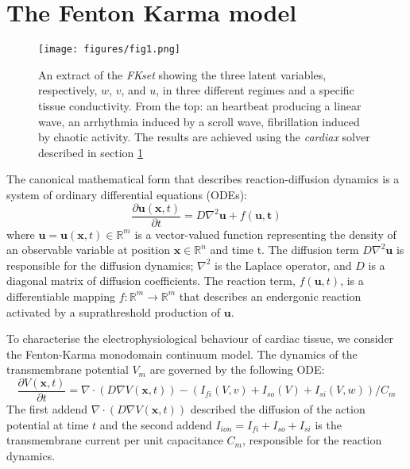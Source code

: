 \documentclass{article}
\begin{document}
    \section{The Fenton Karma model}
    \begin{figure}
        \centering
        \texttt{[image: figures/fig1.png]}
        \caption{An extract of the \textit{FKset} showing the three latent variables, respectively, $w$, $v$, and $u$, in three different regimes and a specific tissue conductivity. From the top: an heartbeat producing a linear wave, an arrhythmia induced by a scroll wave, fibrillation induced by chaotic activity. The results are achieved using the \textit{cardiax} solver described in section \ref{}}
        \label{fig:Figure 1.}
    \end{figure}
        The canonical mathematical form that describes reaction-diffusion dynamics is a system of ordinary differential equations (ODEs):
        \begin{equation}
            \frac{\partial \mathbf{u}(\mathbf{x}, t)}{\partial t} = D\nabla^2 \mathbf{u} + f(\mathbf{u, t})
        \end{equation}
        where $\mathbf{u} = \mathbf{u}(\mathbf{x}, t) \in \mathbb{R}^m$ is a vector-valued function representing the density of an observable variable at position $\mathbf{x} \in \mathbb{R}^n$ and time t.
        The diffusion term $D\nabla^2\mathbf{u}$ is responsible for the diffusion dynamics; $\nabla^2$ is the Laplace operator, and $D$ is a diagonal matrix of diffusion coefficients.
        The reaction term, $f(\mathbf{u}, t)$, is a differentiable mapping $f: \mathbb{R}^m \rightarrow \mathbb{R}^m$ that describes an endergonic reaction activated by a suprathreshold production of $\mathbf{u}$.
        
        To characterise the electrophysiological behaviour of cardiac tissue, we consider the Fenton-Karma\cite{fenton1998vortex} monodomain continuum model. The dynamics of the transmembrane potential $V_m$ are governed by the following ODE:
        \begin{equation}
            \frac{\partial V(\mathbf{x}, t)}{\partial t} = \nabla \cdot (D \nabla V(\mathbf{x},  t)) - {(I_{fi}(V, v) + I_{so}(V) + I_{si}(V, w))} / {C_m}
        \end{equation}
        The first addend $\nabla \cdot (D \nabla V(\mathbf{x},  t))$ described the diffusion of the action potential at time $t$ and the second addend $I_{ion} = I_{fi} + I_{so} + I_{si}$ is the transmembrane current per unit capacitance $C_m$, responsible for the reaction dynamics.
        
\end{document}
